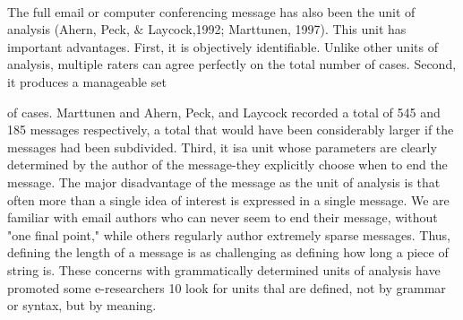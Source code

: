 \\

\noindent The full email or computer conferencing message has also been the unit of analysis (Ahern, Peck, $\&$ Laycock,1992; Marttunen, 1997). This unit has important advan­tages. First, it is objectively identifiable. Unlike other units of analysis, multiple raters can agree perfectly on the total number of cases. Second, it produces a manageable set

 
\newpage
\begin{quote}
\footnotesize
\end{quote}

\noindent of cases. Marttunen and Ahern, Peck, and Laycock recorded a total of 545 and 185 messages respectively, a total that would have been considerably larger if the messages had been subdivided. Third, it isa unit whose parameters are clearly determined by the author of the message-they explicitly choose when to end the message. The major disadvantage of the message as the unit of analysis is that often more than a single idea of interest is expressed in a single message. We are familiar with email authors who can never seem to end their message, without "one final point," while others regularly author extremely sparse messages. Thus, defining the length of a message is as chal­lenging as defining how long a piece of string is. These concerns with grammatically determined units of analysis have promoted some e-researchers 10 look for units thal are defined, not by grammar or syntax, but by meaning.\\

\\

